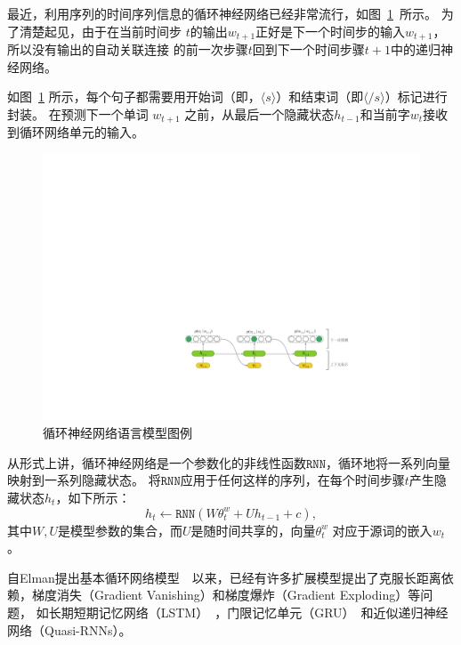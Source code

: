 最近，利用序列的时间序列信息的循环神经网络已经非常流行，如图~\ref{fig:lm}~所示。 为了清楚起见，由于在当前时间步 $ t $的输出$ w_ {t + 1} $正好是下一个时间步的输入$ w_ {t + 1} $，所以没有输出的自动关联连接 的前一次步骤$ t $回到下一个时间步骤$ t + 1 $中的递归神经网络。

如图~\ref{fig:lm} 所示，每个句子都需要用开始词（即，$ \langle s \rangle $）和结束词（即$ \langle / s \rangle $）标记进行封装。 在预测下一个单词 $ w_ {t + 1} $ 之前，从最后一个隐藏状态$ h_ {t-1} $和当前字$ w_t $接收到循环网络单元的输入。
\begin{figure}[!ht]
  \centering
  \includegraphics[width=1\columnwidth]{./figures/lm.pdf}
  \caption{循环神经网络语言模型图例}
  \label{fig:lm}
\end{figure}

从形式上讲，循环神经网络是一个参数化的非线性函数$ \mathtt{RNN} $，循环地将一系列向量映射到一系列隐藏状态。 将$ \mathtt{RNN} $应用于任何这样的序列，在每个时间步骤$ t $产生隐藏状态$ h_t $，如下所示：
\begin{equation}
  h_t \leftarrow  \mathtt{RNN}(W\theta^w_t + U h_{t-1} +c),
\end{equation}
其中$ W,U $是模型参数的集合，而$ U $是随时间共享的，向量$ \theta^w_t$ 对应于源词的嵌入$ w_t $。

自Elman提出基本循环网络模型~~以来，已经有许多扩展模型提出了克服长距离依赖，梯度消失（Gradient Vanishing）和梯度爆炸（Gradient Exploding）等问题， 如长期短期记忆网络（LSTM）~，门限记忆单元（GRU）~和近似递归神经网络（Quasi-RNNs）。

